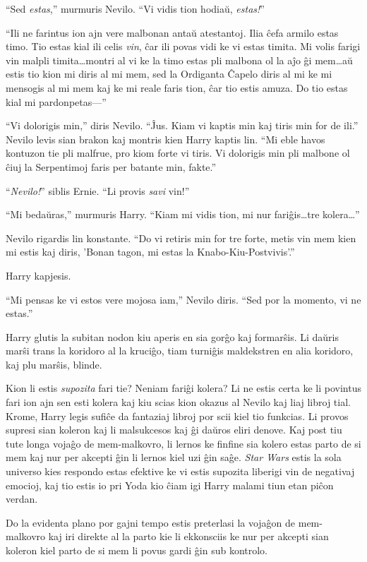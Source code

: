 ``Sed \emph{estas},'' murmuris Nevilo. ``Vi vidis tion hodiaŭ, \emph{estas!}''

``Ili ne farintus ion ajn vere malbonan antaŭ atestantoj. Ilia ĉefa armilo estas
timo. Tio estas kial ili celis \emph{vin}, ĉar ili povas vidi ke vi estas
timita. Mi volis farigi vin malpli timita\ldots montri al vi ke la timo estas
pli malbona ol la aĵo ĝi mem\ldots aŭ estis tio kion mi diris al mi mem, sed la
Ordiganta Ĉapelo diris al mi ke mi mensogis al mi mem kaj ke mi reale faris
tion, ĉar tio estis amuza. Do tio estas kial mi pardonpetas—''

``Vi dolorigis min,'' diris Nevilo. ``Ĵus. Kiam vi kaptis min kaj
tiris min for de ili.'' Nevilo levis sian brakon kaj montris kien
Harry kaptis lin. ``Mi eble havos kontuzon tie pli malfrue, pro kiom
forte vi tiris. Vi dolorigis min pli malbone ol ĉiuj la Serpentimoj
faris per batante min, fakte.''

``\emph{Nevilo!}'' siblis Ernie. ``Li provis \emph{savi} vin!''

``Mi bedaŭras,'' murmuris Harry. ``Kiam mi vidis tion, mi nur fariĝis\ldots tre
kolera\ldots''

Nevilo rigardis lin konstante. ``Do vi retiris min for tre forte, metis vin mem
kien mi estis kaj diris, 'Bonan tagon, mi estas la Knabo-Kiu-Postvivis'.''

Harry kapjesis.

``Mi pensas ke vi estos vere mojosa iam,'' Nevilo diris. ``Sed por la momento,
vi ne estas.''

Harry glutis la subitan nodon kiu aperis en sia gorĝo kaj
formarŝis. Li daŭris marŝi trans la koridoro al la kruciĝo, tiam
turniĝis maldekstren en alia koridoro, kaj plu marŝis, blinde.

Kion li estis \emph{supozita} fari tie? Neniam fariĝi kolera? Li ne estis certa
ke li povintus fari ion ajn sen esti kolera kaj kiu scias kion okazus al Nevilo
kaj liaj libroj tial. Krome, Harry legis sufiĉe da fantaziaj libroj por scii
kiel tio funkcias. Li provos supresi sian koleron kaj li malsukcesos kaj ĝi
daŭros eliri denove. Kaj post tiu tute longa vojaĝo de mem-malkovro, li lernos
ke finfine sia kolero estas parto de si mem kaj nur per akcepti ĝin li lernos
kiel uzi ĝin saĝe. \emph{Star Wars} estis la sola universo kies respondo estas
efektive ke vi estis supozita liberigi vin de negativaj emocioj, kaj tio estis
io pri Yoda kio ĉiam igi Harry malami tiun etan piĉon verdan.

Do la evidenta plano por gajni tempo estis preterlasi la vojaĝon de
mem-malkovro kaj iri direkte al la parto kie li ekkonsciis ke nur per
akcepti sian koleron kiel parto de si mem li povus gardi ĝin sub
kontrolo.

